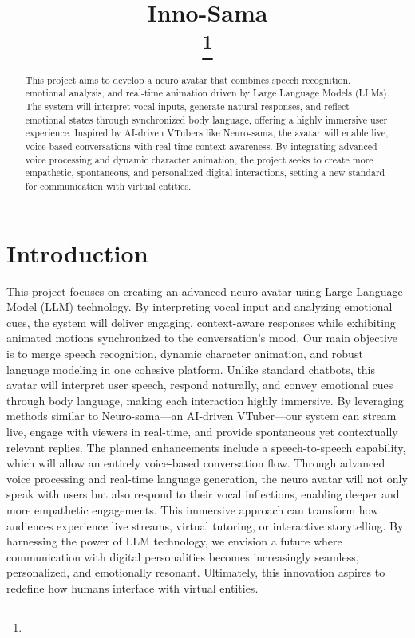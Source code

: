 \documentclass[conference]{IEEEtran}
\begin{document}
\title{Inno-Sama\\
{\footnotesize \textsuperscript{}}
\thanks{}
}

\author{
}

\maketitle

\begin{abstract}
This project aims to develop a neuro avatar that combines speech recognition, emotional analysis, and real-time animation driven by Large Language Models (LLMs). The system will interpret vocal inputs, generate natural responses, and reflect emotional states through synchronized body language, offering a highly immersive user experience. Inspired by AI-driven VTubers like Neuro-sama, the avatar will enable live, voice-based conversations with real-time context awareness. By integrating advanced voice processing and dynamic character animation, the project seeks to create more empathetic, spontaneous, and personalized digital interactions, setting a new standard for communication with virtual entities.
\end{abstract}

\section{Introduction}
This project focuses on creating an advanced neuro avatar using Large Language Model (LLM) technology. By interpreting vocal input and analyzing emotional cues, the system will deliver engaging, context-aware responses while exhibiting animated motions synchronized to the conversation’s mood. Our main objective is to merge speech recognition, dynamic character animation, and robust language modeling in one cohesive platform. Unlike standard chatbots, this avatar will interpret user speech, respond naturally, and convey emotional cues through body language, making each interaction highly immersive. By leveraging methods similar to Neuro-sama—an AI-driven VTuber—our system can stream live, engage with viewers in real-time, and provide spontaneous yet contextually relevant replies. The planned enhancements include a speech-to-speech capability, which will allow an entirely voice-based conversation flow. Through advanced voice processing and real-time language generation, the neuro avatar will not only speak with users but also respond to their vocal inflections, enabling deeper and more empathetic engagements. This immersive approach can transform how audiences experience live streams, virtual tutoring, or interactive storytelling. By harnessing the power of LLM technology, we envision a future where communication with digital personalities becomes increasingly seamless, personalized, and emotionally resonant. Ultimately, this innovation aspires to redefine how humans interface with virtual entities.
\end{document}
